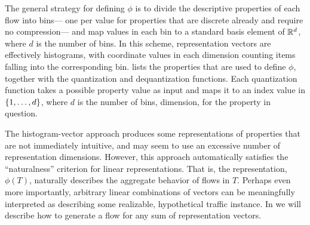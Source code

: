 \documentclass[twocolumn,final]{svjour3}
\begin{document}
The general strategy for defining $\phi$ is to divide the descriptive properties of each flow into bins---%
one per value for properties that are discrete already and require no compression---%
and map values in each bin to a standard basis element of $\mathbb{R}^d$, where $d$ is the number of bins.
In this scheme, representation vectors are effectively histograms, with coordinate values in each dimension counting items falling into the corresponding bin.
 lists the properties that are used to define $\phi$, together with the quantization and dequantization functions.
Each quantization function takes a possible property value as input and maps it to an index value in ${\left\{1,\dots,d\right\}}$, where $d$ is the number of bins,  dimension, for the property in question.

The histogram-vector approach produces some representations of properties that are not immediately intuitive, and may seem to use an excessive number of representation dimensions.
However, this approach automatically satisfies the ``naturalness'' criterion for linear representations.
That is, the representation, $\phi(T)$, naturally describes the aggregate behavior of flows in $T$.
Perhaps even more importantly, arbitrary linear combinations of vectors can be meaningfully interpreted as describing some realizable, hypothetical traffic instance.
In  we will describe how to generate a flow for any sum of representation vectors.
\end{document}
